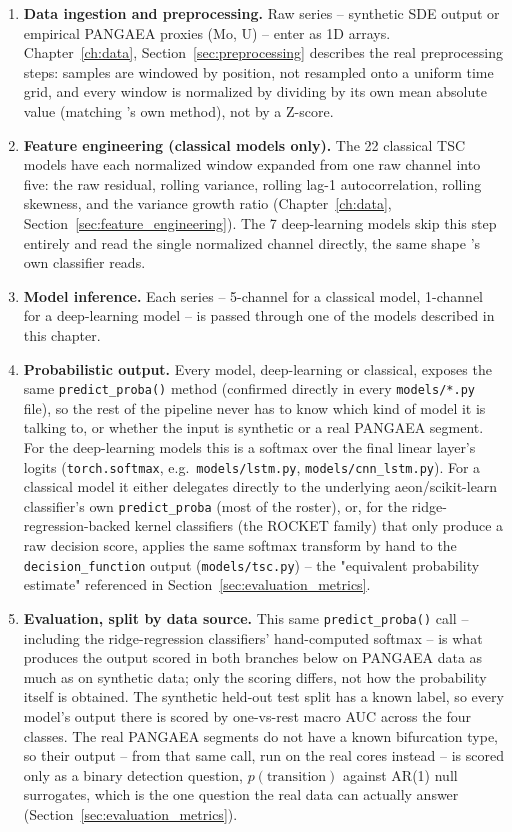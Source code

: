 \begin{enumerate}
    \item \textbf{Data ingestion and preprocessing.} Raw series -- synthetic SDE output or empirical PANGAEA proxies (Mo, U) -- enter as 1D arrays. Chapter~\ref{ch:data}, Section~\ref{sec:preprocessing} describes the real preprocessing steps: samples are windowed by position, not resampled onto a uniform time grid, and every window is normalized by dividing by its own mean absolute value (matching \citet{bury2021}'s own method), not by a Z-score.
    \item \textbf{Feature engineering (classical models only).} The 22 classical TSC models have each normalized window expanded from one raw channel into five: the raw residual, rolling variance, rolling lag-1 autocorrelation, rolling skewness, and the variance growth ratio (Chapter~\ref{ch:data}, Section~\ref{sec:feature_engineering}). The 7 deep-learning models skip this step entirely and read the single normalized channel directly, the same shape \citet{bury2021}'s own classifier reads.
    \item \textbf{Model inference.} Each series -- 5-channel for a classical model, 1-channel for a deep-learning model -- is passed through one of the models described in this chapter.
    \item \textbf{Probabilistic output.} Every model, deep-learning or classical, exposes the same \texttt{predict\_proba()} method (confirmed directly in every \texttt{models/*.py} file), so the rest of the pipeline never has to know which kind of model it is talking to, or whether the input is synthetic or a real PANGAEA segment. For the deep-learning models this is a softmax over the final linear layer's logits (\texttt{torch.softmax}, e.g.\ \texttt{models/lstm.py}, \texttt{models/cnn\_lstm.py}). For a classical model it either delegates directly to the underlying aeon/scikit-learn classifier's own \texttt{predict\_proba} (most of the roster), or, for the ridge-regression-backed kernel classifiers (the ROCKET family) that only produce a raw decision score, applies the same softmax transform by hand to the \texttt{decision\_function} output (\texttt{models/tsc.py}) -- the "equivalent probability estimate" referenced in Section~\ref{sec:evaluation_metrics}.
    \item \textbf{Evaluation, split by data source.} This same \texttt{predict\_proba()} call -- including the ridge-regression classifiers' hand-computed softmax -- is what produces the output scored in both branches below on PANGAEA data as much as on synthetic data; only the scoring differs, not how the probability itself is obtained. The synthetic held-out test split has a known label, so every model's output there is scored by one-vs-rest macro AUC across the four classes. The real PANGAEA segments do not have a known bifurcation type, so their output -- from that same call, run on the real cores instead -- is scored only as a binary detection question, $p(\text{transition})$ against AR(1) null surrogates, which is the one question the real data can actually answer (Section~\ref{sec:evaluation_metrics}).


\end{enumerate}
